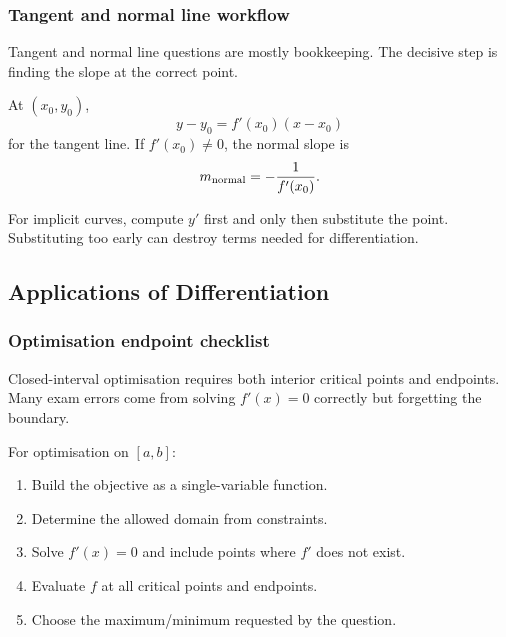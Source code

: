 \newpage
\subsubsection{Tangent and normal line workflow}
\begin{extension}
Tangent and normal line questions are mostly bookkeeping.  The decisive step is
finding the slope at the correct point.
\end{extension}

\begin{keyformula}[title={Tangent and Normal Lines}]
At \((x_0,y_0)\),
\[
y-y_0=f'(x_0)(x-x_0)
\]
for the tangent line.  If \(f'(x_0)\ne0\), the normal slope is
\[
m_{\rm normal}=-\frac{1}{f'(x_0)}.
\]
\end{keyformula}

\begin{commonmistake}
For implicit curves, compute \(y'\) first and only then substitute the point.
Substituting too early can destroy terms needed for differentiation.
\end{commonmistake}

\newpage
\subsection{Applications of Differentiation}

\subsubsection{Optimisation endpoint checklist}
\begin{extension}
Closed-interval optimisation requires both interior critical points and
endpoints.  Many exam errors come from solving \(f'(x)=0\) correctly but
forgetting the boundary.
\end{extension}

\begin{examtip}
For optimisation on \([a,b]\):
\begin{enumerate}[leftmargin=*]
\item Build the objective as a single-variable function.
\item Determine the allowed domain from constraints.
\item Solve \(f'(x)=0\) and include points where \(f'\) does not exist.
\item Evaluate \(f\) at all critical points and endpoints.
\item Choose the maximum/minimum requested by the question.
\end{enumerate}
\end{examtip}

